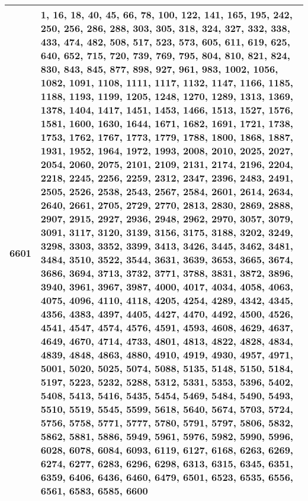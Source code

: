 \documentclass[12pt]{article}
\begin{document}
\begin{tabular}{|c|p{16cm}|}
    6601 & \scriptsize{1, 16, 18, 40, 45, 66, 78, 100, 122, 141, 165, 195, 242, 250, 256, 286, 288, 303, 305, 318, 324, 327, 332, 338, 433, 474, 482, 508, 517, 523, 573, 605, 611, 619, 625, 640, 652, 715, 720, 739, 769, 795, 804, 810, 821, 824, 830, 843, 845, 877, 898, 927, 961, 983, 1002, 1056, 1082, 1091, 1108, 1111, 1117, 1132, 1147, 1166, 1185, 1188, 1193, 1199, 1205, 1248, 1270, 1289, 1313, 1369, 1378, 1404, 1417, 1451, 1453, 1466, 1513, 1527, 1576, 1581, 1600, 1630, 1644, 1671, 1682, 1691, 1721, 1738, 1753, 1762, 1767, 1773, 1779, 1788, 1800, 1868, 1887, 1931, 1952, 1964, 1972, 1993, 2008, 2010, 2025, 2027, 2054, 2060, 2075, 2101, 2109, 2131, 2174, 2196, 2204, 2218, 2245, 2256, 2259, 2312, 2347, 2396, 2483, 2491, 2505, 2526, 2538, 2543, 2567, 2584, 2601, 2614, 2634, 2640, 2661, 2705, 2729, 2770, 2813, 2830, 2869, 2888, 2907, 2915, 2927, 2936, 2948, 2962, 2970, 3057, 3079, 3091, 3117, 3120, 3139, 3156, 3175, 3188, 3202, 3249, 3298, 3303, 3352, 3399, 3413, 3426, 3445, 3462, 3481, 3484, 3510, 3522, 3544, 3631, 3639, 3653, 3665, 3674, 3686, 3694, 3713, 3732, 3771, 3788, 3831, 3872, 3896, 3940, 3961, 3967, 3987, 4000, 4017, 4034, 4058, 4063, 4075, 4096, 4110, 4118, 4205, 4254, 4289, 4342, 4345, 4356, 4383, 4397, 4405, 4427, 4470, 4492, 4500, 4526, 4541, 4547, 4574, 4576, 4591, 4593, 4608, 4629, 4637, 4649, 4670, 4714, 4733, 4801, 4813, 4822, 4828, 4834, 4839, 4848, 4863, 4880, 4910, 4919, 4930, 4957, 4971, 5001, 5020, 5025, 5074, 5088, 5135, 5148, 5150, 5184, 5197, 5223, 5232, 5288, 5312, 5331, 5353, 5396, 5402, 5408, 5413, 5416, 5435, 5454, 5469, 5484, 5490, 5493, 5510, 5519, 5545, 5599, 5618, 5640, 5674, 5703, 5724, 5756, 5758, 5771, 5777, 5780, 5791, 5797, 5806, 5832, 5862, 5881, 5886, 5949, 5961, 5976, 5982, 5990, 5996, 6028, 6078, 6084, 6093, 6119, 6127, 6168, 6263, 6269, 6274, 6277, 6283, 6296, 6298, 6313, 6315, 6345, 6351, 6359, 6406, 6436, 6460, 6479, 6501, 6523, 6535, 6556, 6561, 6583, 6585, 6600} \\
    \hline
\end{tabular}
\end{document}

